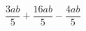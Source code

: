 \begin{ex}
	\begin{condition}
		\( \dfrac{3ab}{5}+\dfrac{16ab}{5}-\dfrac{4ab}{5} \)
	\end{condition}
\end{ex}